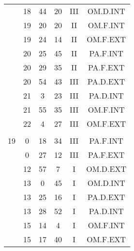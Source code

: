 \documentclass[12pt, a4paper]{article}
\begin{document}
\begin{multicols}{3}
{\begin{tabular}{c c c c c c}
	 	 	 	 & 18 & 44 & 20 & III & OM.D.INT\\%
	 	 	 	 & 19 & 20 & 20 & II & OM.F.INT\\%
	 	 	 	 & 19 & 24 & 14 & II & OM.F.EXT\\%
	 	 	 	 & 20 & 25 & 45 & II & PA.F.INT\\%
	 	 	 	 & 20 & 29 & 35 & II & PA.F.EXT\\%
	 	 	 	 & 20 & 54 & 43 & III & PA.D.EXT\\%
	 	 	 	 & 21 & 3 & 23 & III & PA.D.INT\\%
	 	 	 	 & 21 & 55 & 35 & III & OM.F.INT\\%
	 	 	 	 & 22 & 4 & 27 & III & OM.F.EXT\\%
	 	 	 	 & & & & & \\%
	 	 	 	19 & 0 & 18 & 34 & III & PA.F.INT\\%
	 	 	 	 & 0 & 27 & 12 & III & PA.F.EXT\\%
	 	 	 	 & 12 & 57 & 7 & I & OM.D.EXT\\%
	 	 	 	 & 13 & 0 & 45 & I & OM.D.INT\\%
	 	 	 	 & 13 & 25 & 16 & I & PA.D.EXT\\%
	 	 	 	 & 13 & 28 & 52 & I & PA.D.INT\\%
	 	 	 	 & 15 & 14 & 4 & I & OM.F.INT\\%
	 	 	 	 & 15 & 17 & 40 & I & OM.F.EXT\\%
	 	 \end{tabular}
 	}
\end{multicols}
\end{document}
